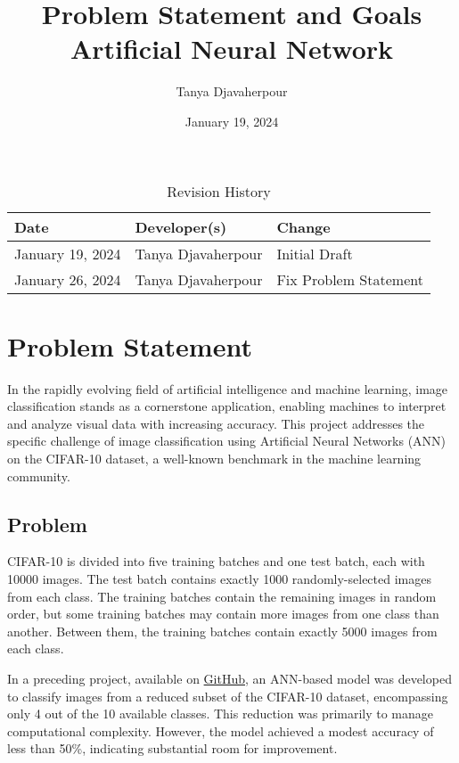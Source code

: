 \documentclass{article}
\title{Problem Statement and Goals\\Artificial Neural Network}
\author{Tanya Djavaherpour}
\date{January 19, 2024}
\begin{document}
\maketitle

\begin{table}[hp]
\caption{Revision History} \label{TblRevisionHistory}
\begin{tabularx}{\textwidth}{llX}
\toprule
\textbf{Date} & \textbf{Developer(s)} & \textbf{Change}\\
\midrule
January 19, 2024 & Tanya Djavaherpour & Initial Draft\\
January 26, 2024 & Tanya Djavaherpour & Fix Problem Statement\\
\bottomrule
\end{tabularx}
\end{table}

\section{Problem Statement}

In the rapidly evolving field of artificial intelligence and machine learning, image classification 
stands as a cornerstone application, enabling machines to interpret and analyze visual data with 
increasing accuracy. This project addresses the specific challenge of image classification using 
Artificial Neural Networks (ANN) on the CIFAR-10 dataset, a well-known benchmark in the machine learning community.

\subsection{Problem}

CIFAR-10 is divided into five training batches and one test batch, 
each with 10000 images. The test batch contains exactly 1000 randomly-selected 
images from each class. The training batches contain the remaining images in random order, 
but some training batches may contain more images from one class than another. Between them, 
the training batches contain exactly 5000 images from each class.

In a preceding project, available on \href{https://github.com/tanya-jp/CIFAR-Classification/tree/main}{GitHub}, an ANN-based model was developed to classify images 
from a reduced subset of the CIFAR-10 dataset, encompassing only 4 out of the 10 available classes. 
This reduction was primarily to manage computational complexity. However, the model achieved a modest 
accuracy of less than 50\%, indicating substantial room for improvement.
\end{document}
